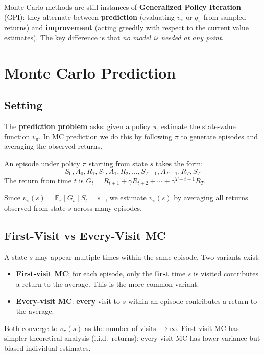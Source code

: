 \documentclass[11pt,a4paper]{article}
\theoremstyle{definition}
\theoremstyle{plain}
\theoremstyle{remark}
\begin{document}
\begin{tcolorbox}[colback=blue!5!white, colframe=blue!60!black, title={Monte Carlo in the GPI Schema}]
Monte Carlo methods are still instances of \textbf{Generalized Policy Iteration} (GPI): they alternate between \textbf{prediction} (evaluating $v_\pi$ or $q_\pi$ from sampled returns) and \textbf{improvement} (acting greedily with respect to the current value estimates). The key difference is that \textit{no model is needed at any point}.
\end{tcolorbox}

\section{Monte Carlo Prediction}

\subsection{Setting}

The \textbf{prediction problem} asks: given a policy $\pi$, estimate the state-value function $v_\pi$. In MC prediction we do this by following $\pi$ to generate episodes and averaging the observed returns.

An episode under policy $\pi$ starting from state $s$ takes the form:
\[
    S_0, A_0, R_1, S_1, A_1, R_2, \ldots, S_{T-1}, A_{T-1}, R_T, S_T
\]
The return from time $t$ is $G_t = R_{t+1} + \gamma R_{t+2} + \cdots + \gamma^{T-t-1} R_T$.

Since $v_\pi(s) = \mathbb{E}_\pi[G_t \mid S_t = s]$, we estimate $v_\pi(s)$ by averaging all returns observed from state $s$ across many episodes.

\subsection{First-Visit vs Every-Visit MC}

A state $s$ may appear multiple times within the same episode. Two variants exist:

\begin{tcolorbox}[colback=blue!5!white, colframe=blue!60!black, title={First-Visit vs Every-Visit Monte Carlo Prediction}]
\begin{itemize}
    \item \textbf{First-visit MC}: for each episode, only the \textbf{first} time $s$ is visited contributes a return to the average. This is the more common variant.
    \item \textbf{Every-visit MC}: \textbf{every} visit to $s$ within an episode contributes a return to the average.
\end{itemize}
Both converge to $v_\pi(s)$ as the number of visits $\to \infty$. First-visit MC has simpler theoretical analysis (i.i.d.\ returns); every-visit MC has lower variance but biased individual estimates.
\end{tcolorbox}
\end{document}
